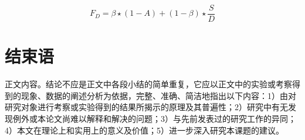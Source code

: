 \begin{equation}
	\label{equa555}
	F_D = \beta \star (1-A) + (1-\beta) \star \frac{S}{D}
\end{equation}

\section{结束语}
正文内容。结论不应是正文中各段小结的简单重复，它应以正文中的实验或考察得到的现象、数据的阐述分析为依据，完整、准确、简洁地指出以下内容：1）由对研究对象进行考察或实验得到的结果所揭示的原理及其普遍性；2）研究中有无发现例外或本论文尚难以解释和解决的问题；3）与先前发表过的研究工作的异同；4）本文在理论上和实用上的意义及价值；5）进一步深入研究本课题的建议。